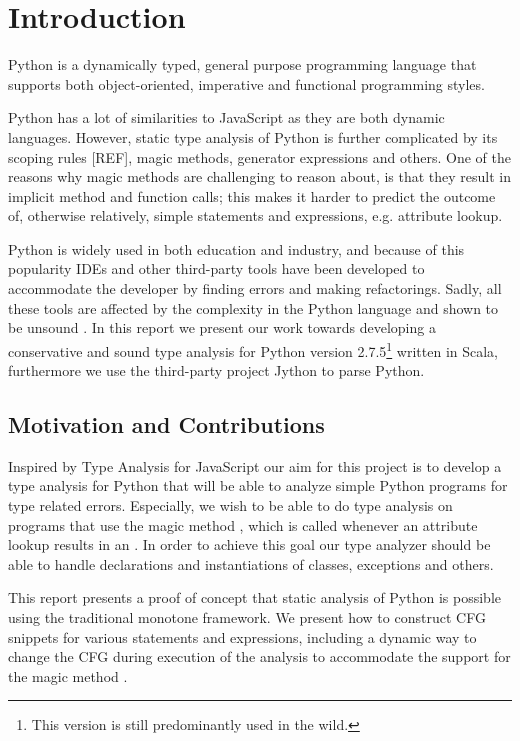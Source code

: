\chapter{Introduction}
Python is a dynamically typed, general purpose programming language that supports both object-oriented, imperative and functional programming styles.

Python has a lot of similarities to JavaScript as they are both dynamic languages. However, static type analysis of Python is further complicated by its scoping rules [REF], magic methods, generator expressions and others. One of the reasons why magic methods are challenging to reason about, is that they result in implicit method and function calls; this makes it harder to predict the outcome of, otherwise relatively, simple statements and expressions, e.g. attribute lookup.

Python is widely used in both education and industry, and because of this popularity IDEs \cite{ide.appcelerator, ide.jetbrains, ide.wingware} and other third-party tools \cite{tool.pep8, tool.pyflakes, tool.pychecker, tool.pylint} have been developed to accommodate the developer by finding errors and making refactorings. Sadly, all these tools are affected by the complexity in the Python language and shown to be unsound \cite{lamdapy}. In this report we present our work towards developing a conservative and sound type analysis for Python version 2.7.5\footnote{This version is still predominantly used in the wild.} written in Scala, furthermore we use the third-party project Jython \cite{jython} to parse Python.

\section{Motivation and Contributions}
Inspired by Type Analysis for JavaScript \cite{tajs} our aim for this project is to develop a type analysis for Python that will be able to analyze simple Python programs for type related errors. Especially, we wish to be able to do type analysis on programs that use the magic method , which is called whenever an attribute lookup results in an . In order to achieve this goal our type analyzer should be able to handle declarations and instantiations of classes, exceptions and others.

This report presents a proof of concept that static analysis of Python is possible using the traditional monotone framework. We present how to construct CFG snippets for various statements and expressions, including a dynamic way to change the CFG during execution of the analysis to accommodate the support for the magic method .  

